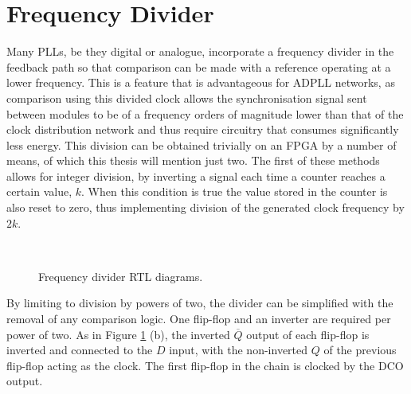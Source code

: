 \section{Frequency Divider}
Many \ac{PLL}s, be they digital or analogue, incorporate a frequency divider in the feedback path so that comparison can be made with a reference operating at a lower frequency. This is a feature that is advantageous for \ac{ADPLL} networks, as comparison using this divided clock allows the synchronisation signal sent between modules to be of a frequency orders of magnitude lower than that of the clock distribution network and thus require circuitry that consumes significantly less energy. This division can be obtained trivially on an \ac{FPGA} by a number of means, of which this thesis will mention just two. The first of these methods allows for integer division, by inverting a signal each time a counter reaches a certain value, $k$. When this condition is true the value stored in the counter is also reset to zero, thus implementing division of the generated clock frequency by $2k$.
\begin{figure}[h]%
	\centering
	\\
	\caption{Frequency divider \ac{RTL} diagrams.}
	\label{fig:divs}
\end{figure}
By limiting to division by powers of two, the divider can be simplified with the removal of any comparison logic. One flip-flop and an inverter are required per power of two. As in Figure \ref{fig:divs} (b), the inverted $\overline{Q}$ output of each flip-flop is inverted and connected to the $D$ input, with the non-inverted $Q$ of the previous flip-flop acting as the clock. The first flip-flop in the chain is clocked by the \ac{DCO} output. 

